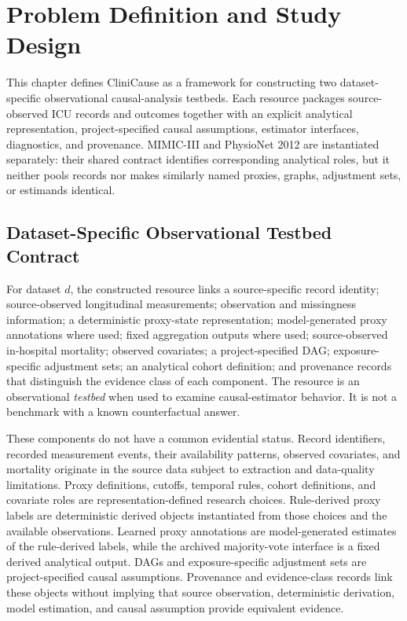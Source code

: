 \chapter{Problem Definition and Study Design}
\label{chap:problem-definition-study-design}

This chapter defines CliniCause as a framework for constructing two dataset-specific observational causal-analysis testbeds.  Each resource packages source-observed ICU records and outcomes together with an explicit analytical representation, project-specified causal assumptions, estimator interfaces, diagnostics, and provenance.  MIMIC-III and PhysioNet 2012 are instantiated separately: their shared contract identifies corresponding analytical roles, but it neither pools records nor makes similarly named proxies, graphs, adjustment sets, or estimands identical.

\section{Dataset-Specific Observational Testbed Contract}
\label{sec:problem-definition-study-design:testbed-contract}

For dataset \(d\), the constructed resource links a source-specific record identity; source-observed longitudinal measurements; observation and missingness information; a deterministic proxy-state representation; model-generated proxy annotations where used; fixed aggregation outputs where used; source-observed in-hospital mortality; observed covariates; a project-specified DAG; exposure-specific adjustment sets; an analytical cohort definition; and provenance records that distinguish the evidence class of each component.  The resource is an observational \emph{testbed} when used to examine causal-estimator behavior.  It is not a benchmark with a known counterfactual answer.

These components do not have a common evidential status.  Record identifiers, recorded measurement events, their availability patterns, observed covariates, and mortality originate in the source data subject to extraction and data-quality limitations.  Proxy definitions, cutoffs, temporal rules, cohort definitions, and covariate roles are representation-defined research choices.  Rule-derived proxy labels are deterministic derived objects instantiated from those choices and the available observations.  Learned proxy annotations are model-generated estimates of the rule-derived labels, while the archived majority-vote interface is a fixed derived analytical output.  DAGs and exposure-specific adjustment sets are project-specified causal assumptions.  Provenance and evidence-class records link these objects without implying that source observation, deterministic derivation, model estimation, and causal assumption provide equivalent evidence.

